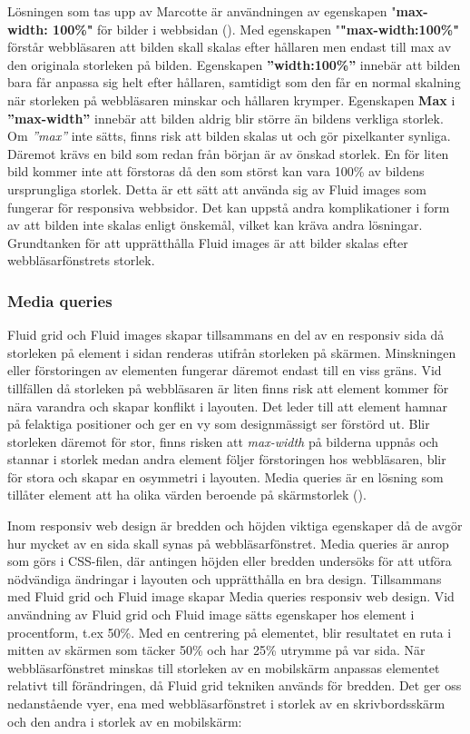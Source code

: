 \documentclass[11pt]{article}
\begin{document}
Lösningen som tas upp av Marcotte är användningen av egenskapen "\textbf{max-width: 100\%"} för bilder i webbsidan (\cite[s. 45]{resp}). Med egenskapen "\textbf{"max-width:100\%"}  förstår webbläsaren att bilden skall skalas efter hållaren men endast till max av den originala storleken på bilden. Egenskapen \textbf{”width:100\%”} innebär att bilden bara får anpassa sig helt efter hållaren, samtidigt som den får en normal skalning när storleken på webbläsaren minskar och hållaren krymper. Egenskapen \textbf{Max} i \textbf{”max-width”} innebär att bilden aldrig blir större än bildens verkliga storlek. Om \textit{”max”} inte sätts, finns risk att bilden skalas ut och gör pixelkanter synliga. Däremot krävs en bild som redan från början är av önskad storlek. En för liten bild kommer inte att förstoras då den som störst kan vara 100\% av bildens ursprungliga storlek. Detta är ett sätt att använda sig av Fluid images som fungerar för responsiva webbsidor. Det kan uppstå andra komplikationer i form av att bilden inte skalas enligt önskemål, vilket kan kräva andra lösningar. Grundtanken för att upprätthålla Fluid images är att bilder skalas efter webbläsarfönstrets storlek.

\subsubsection{Media queries}
Fluid grid och Fluid images skapar tillsammans en del av en responsiv sida då storleken på element i sidan renderas utifrån storleken på skärmen. Minskningen eller förstoringen av elementen fungerar däremot endast till en viss gräns. Vid tillfällen då storleken på webbläsaren är liten finns risk att element kommer för nära varandra och skapar konflikt i layouten. Det leder till att element hamnar på felaktiga positioner och ger en vy som designmässigt ser förstörd ut. Blir storleken däremot för stor, finns risken att \textit{max-width} på bilderna uppnås och stannar i storlek medan andra element följer förstoringen hos webbläsaren, blir för stora och skapar en osymmetri i layouten. Media queries är en lösning som tillåter element att ha olika värden beroende på skärmstorlek (\cite[s. 65]{resp}).

Inom responsiv web design är bredden och höjden viktiga egenskaper då de avgör hur mycket av en sida skall synas på webbläsarfönstret.  Media queries är anrop som görs i CSS-filen, där antingen höjden eller bredden undersöks för att utföra nödvändiga ändringar i layouten och upprätthålla en bra design. Tillsammans med Fluid grid och Fluid image skapar Media queries responsiv web design.
\newpage
Vid användning av Fluid grid och Fluid image sätts egenskaper hos element i procentform, t.ex 50\%. Med en centrering på elementet, blir resultatet en ruta i mitten av skärmen som täcker 50\% och har 25\% utrymme på var sida. När webbläsarfönstret minskas till storleken av en mobilskärm anpassas elementet relativt till förändringen, då Fluid grid tekniken används för bredden. Det ger oss nedanstående vyer, ena med webbläsarfönstret i storlek av en skrivbordsskärm och den andra i storlek av en mobilskärm:
\end{document}
